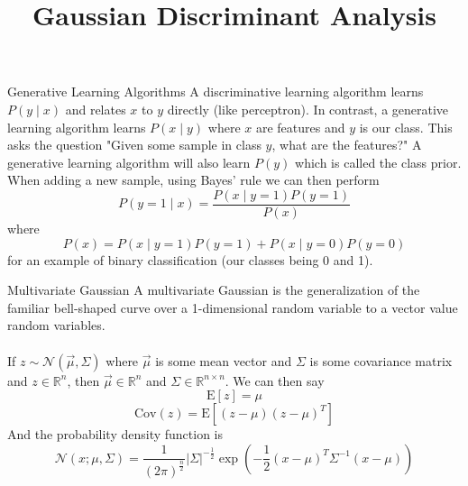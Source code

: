 \documentclass[11pt]{article}
\title{Gaussian Discriminant Analysis}
\author{}
\date{}
\begin{document}
\maketitle
\vspace{-1.2em}
\begin{section}{Generative Learning Algorithms}
A discriminative learning algorithm learns $P(y \mid x)$ and relates $x$ to $y$ directly (like perceptron). In contrast, a generative learning algorithm learns $P(x \mid y)$ where $x$ are features and $y$ is our class. This asks the question "Given some sample in class $y$, what are the features?" A generative learning algorithm will also learn $P(y)$ which is called the class prior. When adding a new sample, using Bayes' rule we can then perform
$$P(y=1 \mid x) = \frac{P(x \mid y=1)P(y=1)}{P(x)}$$
where
$$P(x) = P(x \mid y=1)P(y=1) + P(x \mid y=0)P(y=0)$$
for an example of binary classification (our classes being 0 and 1).
\end{section}
\begin{section}{Multivariate Gaussian}
A multivariate Gaussian is the generalization of the familiar bell-shaped curve over a 1-dimensional random variable to a vector value random variables.\\
\vspace{0em}\\
If $z \sim \mathcal{N}(\vec{\mu}, \Sigma)$ where $\vec{\mu}$ is some mean vector and $\Sigma$ is some covariance matrix and $z \in \mathbb{R}^n$, then $\vec{\mu} \in \mathbb{R}^n$ and $\Sigma \in \mathbb{R}^{n\times n}$. We can then say $$\text{E}[z] = \mu$$ $$\text{Cov}(z) = \text{E}\left[(z-\mu)(z-\mu)^T\right]$$
And the probability density function is
$$\mathcal{N}(x; \mu,\Sigma) = \frac{1}{(2\pi)^{\frac{n}{2}}}\left|\Sigma\right|^{-\frac{1}{2}}\exp{\left(-\frac{1}{2}(x-\mu)^T \Sigma^{-1}(x-\mu)\right)}$$
\end{section}
\end{document}
